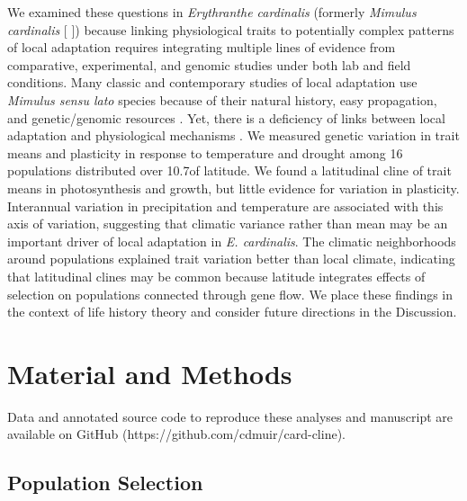 \documentclass[11pt, oneside]{article}
\begin{document}
We examined these questions in \textit{Erythranthe cardinalis} (formerly \textit{Mimulus cardinalis} [\citeauthor{Nesom_2014} \citeyear{Nesom_2014}]) because linking physiological traits to potentially complex patterns of local adaptation requires integrating multiple lines of evidence from comparative, experimental, and genomic studies under both lab and field conditions. Many classic and contemporary studies of local adaptation use \textit{Mimulus sensu lato} species because of their natural history, easy propagation, and genetic/genomic resources \citep{Clausen_etal_1940, Hiesey_etal_1971, Bradshaw_Schemske_2003, Wu_etal_2008, Lowry_Willis_2010, Wright_etal_2013}. Yet, there is a deficiency of links between local adaptation and physiological mechanisms \citep{Angert_2006, Angert_etal_2008, Wu_etal_2010, Wright_etal_2013}. We measured genetic variation in trait means and plasticity in response to temperature and drought among 16 populations distributed over 10.7\textdegree of latitude. We found a latitudinal cline of trait means in photosynthesis and growth, but little evidence for variation in plasticity. Interannual variation in precipitation and temperature are associated with this axis of variation, suggesting that climatic variance rather than mean may be an important driver of local adaptation in \textit{E. cardinalis}. The climatic neighborhoods around populations explained trait variation better than local climate, indicating that latitudinal clines may be common because latitude integrates effects of selection on populations connected through gene flow. We place these findings in the context of life history theory and consider future directions in the Discussion. 

\section*{Material and Methods}

Data and annotated source code to reproduce these analyses and manuscript are available on GitHub (https://github.com/cdmuir/card-cline).


\subsection*{Population Selection}
\end{document}
